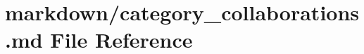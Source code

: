 \hypertarget{category__collaborations_8md}{}\section{markdown/category\+\_\+collaborations.md File Reference}
\label{category__collaborations_8md}
